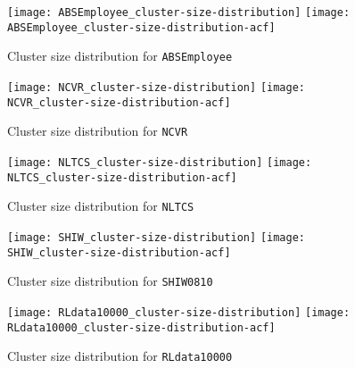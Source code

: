 \documentclass[12pt,letterpaper]{article}
\newcommand{\1}[1]{\mathbb{I}\!\left[#1\right]} %
\begin{document}
\begin{figure}[H]
  \texttt{[image: ABSEmployee\_cluster-size-distribution]} \hfill
  \texttt{[image: ABSEmployee\_cluster-size-distribution-acf]}
  \caption{Cluster size distribution for \texttt{ABSEmployee}}
\end{figure}
\begin{figure}[H]
  \texttt{[image: NCVR\_cluster-size-distribution]} \hfill
  \texttt{[image: NCVR\_cluster-size-distribution-acf]}
  \caption{Cluster size distribution for \texttt{NCVR}}
\end{figure}
\begin{figure}[H]
  \texttt{[image: NLTCS\_cluster-size-distribution]} \hfill
  \texttt{[image: NLTCS\_cluster-size-distribution-acf]}
  \caption{Cluster size distribution for \texttt{NLTCS}}
\end{figure}
\begin{figure}[H]
  \texttt{[image: SHIW\_cluster-size-distribution]} \hfill
  \texttt{[image: SHIW\_cluster-size-distribution-acf]}
  \caption{Cluster size distribution for \texttt{SHIW0810}}
\end{figure}
\begin{figure}[H]
  \texttt{[image: RLdata10000\_cluster-size-distribution]} \hfill
  \texttt{[image: RLdata10000\_cluster-size-distribution-acf]}
  \caption{Cluster size distribution for \texttt{RLdata10000}}
\end{figure}

{
\footnotesize


}
\end{document}
